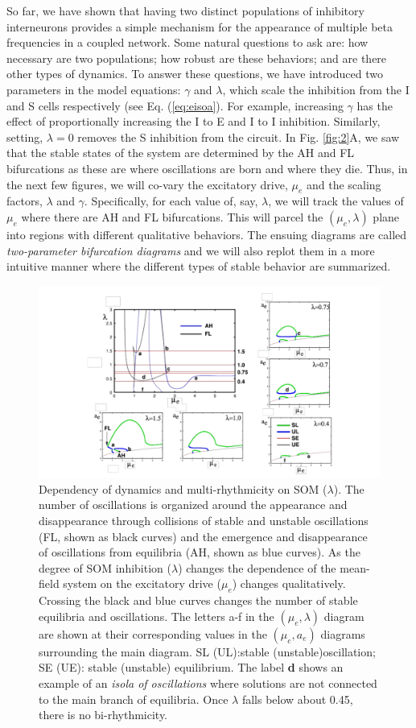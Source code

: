 \documentclass[10pt,letterpaper]{article}
\begin{document}
So far, we have shown that having two distinct populations of inhibitory interneurons provides a simple mechanism for the appearance of multiple beta frequencies in a coupled network. Some natural questions to ask are: how necessary are two populations; how robust are these behaviors; and are there other types of dynamics.  To answer these questions, we have introduced two parameters in the model equations: $\gamma$ and $\lambda$, which scale the inhibition from the I and S cells respectively (see Eq. (\ref{eq:eisoa}). For example, increasing $\gamma$ has the effect of proportionally increasing the I to E and I to I inhibition. Similarly, setting, $\lambda=0$ removes the S inhibition from the circuit.  In Fig. \ref{fig:2}A, we saw that the stable states of the system are determined by the AH and FL bifurcations as these are where oscillations are born and where they die.  Thus, in the next few figures, we will co-vary the excitatory drive, $\mu_e$ and the scaling factors, $\lambda$ and $\gamma$.  Specifically, for each value of, say, $\lambda$, we will track the values of $\mu_e$ where there are AH and FL bifurcations.  This will parcel the $(\mu_e,\lambda)$ plane into regions with different qualitative behaviors. The ensuing diagrams are called {\em two-parameter bifurcation diagrams} and we will also replot them in a more intuitive manner where the different types of stable behavior are summarized.  


\begin{figure}
\includegraphics[width=.9\textwidth]{afig5.pdf}
\caption{Dependency of dynamics and multi-rhythmicity on SOM ($\lambda$). The number of oscillations is organized around the appearance and disappearance through collisions of stable and unstable oscillations (FL, shown as black curves) and the emergence and disappearance of oscillations from equilibria (AH, shown as blue curves). As the degree of SOM inhibition ($\lambda$) changes the dependence of the mean-field system on the excitatory drive ($\mu_e$) changes qualitatively. Crossing the black and blue curves changes the number of stable equilibria and oscillations. The letters a-f in the $(\mu_e,\lambda)$ diagram are shown at their corresponding values in the $(\mu_e,a_e)$ diagrams surrounding the main diagram. SL (UL):stable (unstable)oscillation; SE (UE): stable (unstable) equilibrium.  The label {\bf d} shows an example of an {\em isola of oscillations} where solutions are not connected to the main branch of equilibria. Once $\lambda$ falls below about 0.45, there is no bi-rhythmicity. }
\label{fig:4}
\end{figure}
\end{document}
